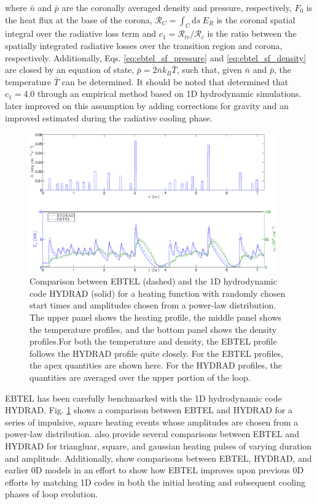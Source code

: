where $\bar{n}$ and $\bar{p}$ are the coronally averaged density and pressure, respectively, $F_0$ is the heat flux at the base of the corona, $\mathcal{R}_C=\int_C\mathrm{d}s~E_R$ is the coronal spatial integral over the radiative loss term and $c_1=\mathcal{R}_{tr}/\mathcal{R}_c$ is the ratio between the spatially integrated radiative losses over the transition region and corona, respectively. Additionally, Eqs. \ref{eq:ebtel_sf_pressure} and \ref{eq:ebtel_sf_density} are closed by an equation of state, $\bar{p}=2\bar{n}k_B\bar{T}$, such that, given $\bar{n}$ and $\bar{p}$, the temperature $\bar{T}$ can be determined. It should be noted that \citet{klimchuk_highly_2008} determined that $c_1=4.0$ through an empirical method based on 1D hydrodynamic simulations. \citet{cargill_enthalpy-based_2012} later improved on this assumption by adding corrections for gravity and an improved estimated during the radiative cooling phase.
%
\begin{figure}
	\centering
	\includegraphics[width=0.95\textwidth]{figures/ebtel_sf_compare.eps}
	\caption{Comparison between EBTEL (dashed) and the 1D hydrodynamic code HYDRAD (solid) for a heating function with randomly chosen start times and amplitudes chosen from a power-law distribution. The upper panel shows the heating profile, the middle panel shows the temperature profiles, and the bottom panel shows the density profiles.For both the temperature and density, the EBTEL profile follows the HYDRAD profile quite closely. For the EBTEL profiles, the apex quantities are shown here. For the HYDRAD profiles, the quantities are averaged over the upper portion of the loop.}
	\label{fig:ebtel_sf_compare}
\end{figure}
%
\par EBTEL has been carefully benchmarked with the 1D hydrodynamic code HYDRAD. Fig. \ref{fig:ebtel_sf_compare} shows a comparison between EBTEL and HYDRAD for a series of impulsive, square heating events whose amplitudes are chosen from a power-law distribution. \citet{cargill_enthalpy-based_2012} also provide several comparisons between EBTEL and HYDRAD for triangluar, square, and gaussian heating pulses of varying duration and amplitude. Additionally, \citet{cargill_enthalpy-based_2012-1} show comparisons between EBTEL, HYDRAD, and earlier 0D models in an effort to show how EBTEL improves upon previous 0D efforts by matching 1D codes in both the initial heating and subsequent cooling phases of loop evolution.
%
